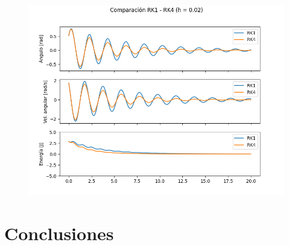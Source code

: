 \documentclass[titlepage,a4paper]{article}
\begin{document}
\begin{figure}[H]
    \centering
    \includegraphics[scale = 0.4]{amortiguado2.png}
    \caption{}
\end{figure}

\section{Conclusiones}\label{sec:conclusiones}

    

    
\end{document}
